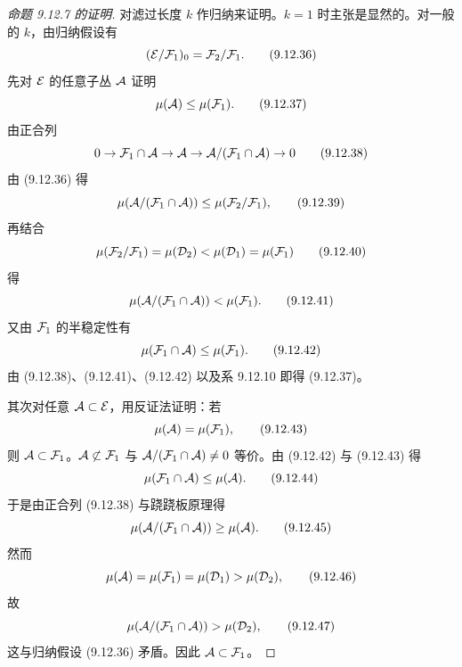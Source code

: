 \begin{proof}[命题 9.12.7 的证明]
  对滤过长度 $k$ 作归纳来证明。$k=1$ 时主张是显然的。对一般的 $k$，由归纳假设有
  \begin{equation}
    (\mathcal{E}/\mathcal{F}_1)_0=\mathcal{F}_2/\mathcal{F}_1.
    \tag{9.12.36}
  \end{equation}
  先对 $\mathcal{E}$ 的任意子丛 $\mathcal{A}$ 证明
  \begin{equation}
    \mu(\mathcal{A})\le\mu(\mathcal{F}_1).
    \tag{9.12.37}
  \end{equation}
  由正合列
  \begin{equation}
    0\to\mathcal{F}_1\cap\mathcal{A}\to\mathcal{A}\to\mathcal{A}/(\mathcal{F}_1\cap\mathcal{A})\to0
    \tag{9.12.38}
  \end{equation}
  由 (9.12.36) 得
  \begin{equation}
    \mu(\mathcal{A}/(\mathcal{F}_1\cap\mathcal{A}))\le\mu(\mathcal{F}_2/\mathcal{F}_1),
    \tag{9.12.39}
  \end{equation}
  再结合
  \begin{equation}
    \mu(\mathcal{F}_2/\mathcal{F}_1)=\mu(\mathcal{D}_2)<\mu(\mathcal{D}_1)=\mu(\mathcal{F}_1)
    \tag{9.12.40}
  \end{equation}
  得
  \begin{equation}
    \mu(\mathcal{A}/(\mathcal{F}_1\cap\mathcal{A}))<\mu(\mathcal{F}_1).
    \tag{9.12.41}
  \end{equation}
  又由 $\mathcal{F}_1$ 的半稳定性有
  \begin{equation}
    \mu(\mathcal{F}_1\cap\mathcal{A})\le\mu(\mathcal{F}_1).
    \tag{9.12.42}
  \end{equation}
  由 (9.12.38)、(9.12.41)、(9.12.42) 以及系 9.12.10 即得 (9.12.37)。

  其次对任意 $\mathcal{A}\subset\mathcal{E}$，用反证法证明：若
  \begin{equation}
    \mu(\mathcal{A})=\mu(\mathcal{F}_1),
    \tag{9.12.43}
  \end{equation}
  则 $\mathcal{A}\subset\mathcal{F}_1$。$\mathcal{A}\not\subset\mathcal{F}_1$ 与 $\mathcal{A}/(\mathcal{F}_1\cap\mathcal{A})\ne0$ 等价。由 (9.12.42) 与 (9.12.43) 得
  \begin{equation}
    \mu(\mathcal{F}_1\cap\mathcal{A})\le\mu(\mathcal{A}).
    \tag{9.12.44}
  \end{equation}
  于是由正合列 (9.12.38) 与跷跷板原理得
  \begin{equation}
    \mu(\mathcal{A}/(\mathcal{F}_1\cap\mathcal{A}))\ge\mu(\mathcal{A}).
    \tag{9.12.45}
  \end{equation}
  然而
  \begin{equation}
    \mu(\mathcal{A})=\mu(\mathcal{F}_1)=\mu(\mathcal{D}_1)>\mu(\mathcal{D}_2),
    \tag{9.12.46}
  \end{equation}
  故
  \begin{equation}
    \mu(\mathcal{A}/(\mathcal{F}_1\cap\mathcal{A}))>\mu(\mathcal{D}_2),
    \tag{9.12.47}
  \end{equation}
  这与归纳假设 (9.12.36) 矛盾。因此 $\mathcal{A}\subset\mathcal{F}_1$。
\end{proof}

